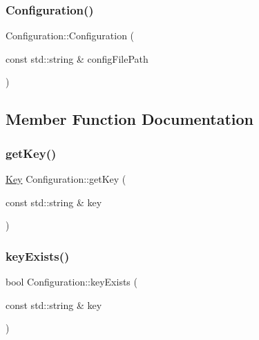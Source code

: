 \mbox{\label{class_configuration_a30714cf8b087e25ae72f5acd49355885}} 
\subsubsection{\texorpdfstring{Configuration()}{Configuration()}\hspace{0.1cm}{\footnotesize\ttfamily [2/2]}}
{\footnotesize\ttfamily Configuration\+::\+Configuration (\begin{DoxyParamCaption}\item[{const std\+::string \&}]{config\+File\+Path }\end{DoxyParamCaption})}



\subsection{Member Function Documentation}
\mbox{\label{class_configuration_a8997893ed1c7d6e26bf426150e7476ac}} 
\subsubsection{\texorpdfstring{get\+Key()}{getKey()}}
{\footnotesize\ttfamily \hyperlink{struct_key}{Key} Configuration\+::get\+Key (\begin{DoxyParamCaption}\item[{const std\+::string \&}]{key }\end{DoxyParamCaption})}

\mbox{\label{class_configuration_a12fe6160c0d9e22d1349378e56141706}} 
\subsubsection{\texorpdfstring{key\+Exists()}{keyExists()}}
{\footnotesize\ttfamily bool Configuration\+::key\+Exists (\begin{DoxyParamCaption}\item[{const std\+::string \&}]{key }\end{DoxyParamCaption})}


